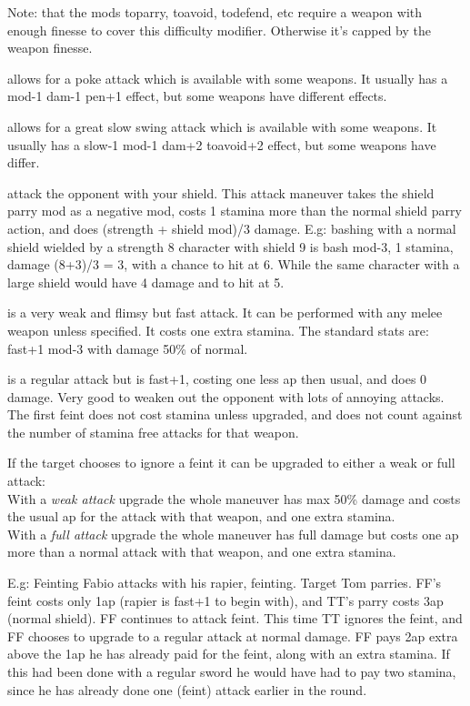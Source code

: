 Note: that the mods toparry, toavoid, todefend, etc require a weapon with enough finesse to cover this difficulty modifier. Otherwise it's capped by the weapon finesse.


\openskillslist


 allows for a poke attack which is available with some weapons. It usually has a mod-1 dam-1 pen+1 effect, but some weapons have different effects.


 allows for a great slow swing attack which is available with some weapons. It usually has a slow-1 mod-1 dam+2 toavoid+2 effect, but some weapons have differ.


 attack the opponent with your shield. This attack maneuver takes the shield parry mod as a negative mod, costs 1 stamina more than the normal shield parry action, and does (strength + shield mod)/3 damage. E.g: bashing with a normal shield wielded by a strength 8 character with shield 9 is bash mod-3, 1 stamina, damage (8+3)/3 = 3, with a chance to hit at 6. While the same character with a large shield would have 4 damage and to hit at 5.


 is a very weak and flimsy but fast attack. It can be performed with any melee weapon unless specified. It costs one extra stamina. The standard stats are:\\
fast+1 mod-3 with damage 50\% of normal.


 is a regular attack but is fast+1, costing one less ap then usual, and does 0 damage. Very good to weaken out the opponent with lots of annoying attacks. The first feint does not cost stamina unless upgraded, and does not count against the number of stamina free attacks for that weapon.

If the target chooses to ignore a feint it can be upgraded to either a weak or full attack:\\
With a \emph{weak attack} upgrade the whole maneuver has max 50\% damage and costs the usual ap for the attack with that weapon, and one extra stamina.\\
With a \emph{full attack} upgrade the whole maneuver has full damage but costs one ap more than a normal attack with that weapon, and one extra stamina.

E.g: Feinting Fabio attacks with his rapier, feinting. Target Tom parries. FF's feint costs only 1ap (rapier is fast+1 to begin with), and TT's parry costs 3ap (normal shield). FF continues to attack feint. This time TT ignores the feint, and FF chooses to upgrade to a regular attack at normal damage. FF pays 2ap extra above the 1ap he has already paid for the feint, along with an extra stamina. If this had been done with a regular sword he would have had to pay two stamina, since he has already done one (feint) attack earlier in the round.


